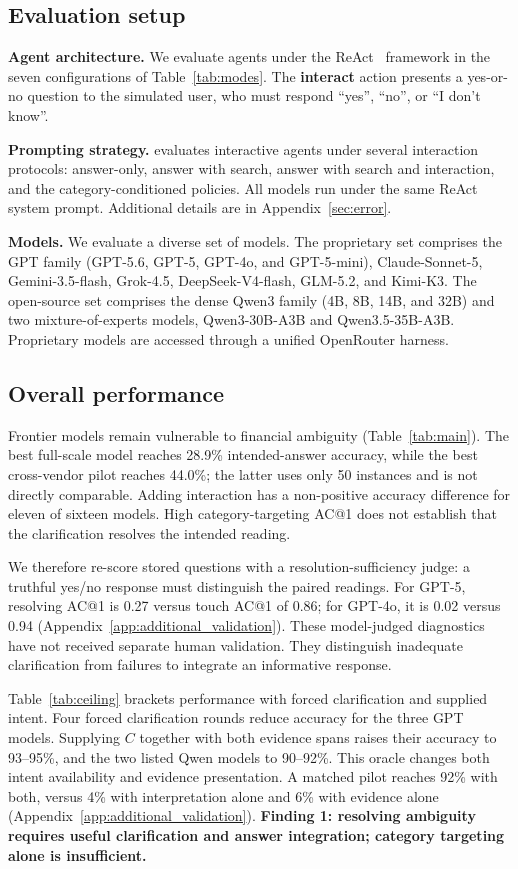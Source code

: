 \subsection{Evaluation setup}
\textbf{Agent architecture.} We evaluate agents under the ReAct~\citep{yao2023react} framework in the seven configurations of Table~\ref{tab:modes}. The \textbf{interact} action presents a yes-or-no question to the simulated user, who must respond ``yes'', ``no'', or ``I don't know''.

\textbf{Prompting strategy.} \fininteract evaluates interactive agents under several interaction protocols: answer-only, answer with search, answer with search and interaction, and the category-conditioned policies. All models run under the same ReAct system prompt. Additional details are in Appendix~\ref{sec:error}.

\textbf{Models.} We evaluate a diverse set of models. The proprietary set comprises the GPT family (GPT-5.6, GPT-5, GPT-4o, and GPT-5-mini), Claude-Sonnet-5, Gemini-3.5-flash, Grok-4.5, DeepSeek-V4-flash, GLM-5.2, and Kimi-K3. The open-source set comprises the dense Qwen3 family (4B, 8B, 14B, and 32B) and two mixture-of-experts models, Qwen3-30B-A3B and Qwen3.5-35B-A3B. Proprietary models are accessed through a unified OpenRouter harness.

\subsection{Overall performance}
\label{sec:ceiling}
Frontier models remain vulnerable to financial ambiguity (Table~\ref{tab:main}). The best full-scale model reaches 28.9\% intended-answer accuracy, while the best cross-vendor pilot reaches 44.0\%; the latter uses only 50 instances and is not directly comparable. Adding interaction has a non-positive accuracy difference for eleven of sixteen models. High category-targeting AC@1 does not establish that the clarification resolves the intended reading.

We therefore re-score stored questions with a resolution-sufficiency judge: a truthful yes/no response must distinguish the paired readings. For GPT-5, resolving AC@1 is 0.27 versus touch AC@1 of 0.86; for GPT-4o, it is 0.02 versus 0.94 (Appendix~\ref{app:additional_validation}). These model-judged diagnostics have not received separate human validation. They distinguish inadequate clarification from failures to integrate an informative response.

Table~\ref{tab:ceiling} brackets performance with forced clarification and supplied intent. Four forced clarification rounds reduce accuracy for the three GPT models. Supplying $C$ together with both evidence spans raises their accuracy to 93--95\%, and the two listed Qwen models to 90--92\%. This oracle changes both intent availability and evidence presentation. A matched pilot reaches 92\% with both, versus 4\% with interpretation alone and 6\% with evidence alone (Appendix~\ref{app:additional_validation}). \textbf{Finding 1: resolving ambiguity requires useful clarification and answer integration; category targeting alone is insufficient.}

